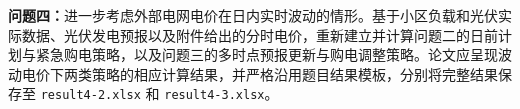 \textbf{问题四：}进一步考虑外部电网电价在日内实时波动的情形。基于小区负载和光伏实际数据、光伏发电预报以及附件给出的分时电价，重新建立并计算问题二的日前计划与紧急购电策略，以及问题三的多时点预报更新与购电调整策略。论文应呈现波动电价下两类策略的相应计算结果，并严格沿用题目结果模板，分别将完整结果保存至 \texttt{result4-2.xlsx} 和 \texttt{result4-3.xlsx}。
